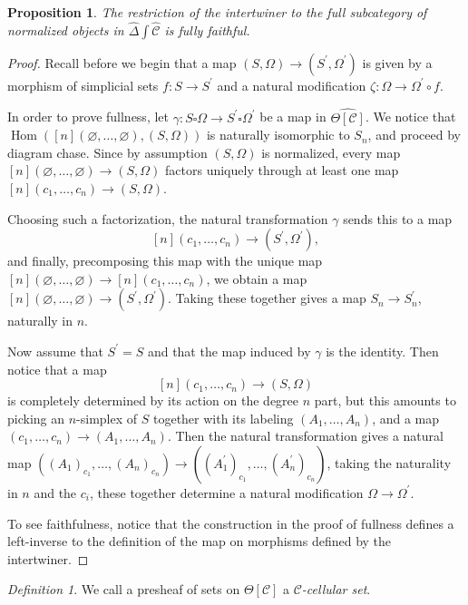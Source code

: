 \documentclass[leqno]{article}
\numberwithin{equation}{subsection}
\theoremstyle{plain}   %
\newtheorem{prop}[equation]{Proposition}
\theoremstyle{remark}
\newtheorem{defn}[equation]{Definition}
\theoremstyle{plain}
\DeclareMathOperator{\Hom}{Hom}
\providecommand{\C}{}
\renewcommand{\C}{\ensuremath{\mathcal{C}}}
\newcommand{\cellset}{\ensuremath{\widehat{\Theta[\mathcal{C}]}}}
\newcommand{\ssetlab}{\ensuremath{\widehat{\Delta} \int \widehat{\mathcal{C}}}}
\begin{document}
\begin{prop} The restriction of the intertwiner to the full subcategory of normalized objects in \(\ssetlab\) is fully faithful.
\end{prop}
\begin{proof}
	Recall before we begin that a map \((S,\Omega)\to (S^\prime,\Omega^\prime)\) is given by a morphism of simplicial sets \(f:S\to S^\prime\) and a natural modification \(\zeta:\Omega\to \Omega^\prime\circ f\).

	In order to prove fullness, let \(\gamma:S\square\Omega\to S^\prime\square\Omega^\prime\) be a map in \(\cellset\). We notice that \(\Hom([n](\varnothing,\dots,\varnothing), (S,\Omega))\) is naturally isomorphic to \(S_n\), and proceed by diagram chase. Since by assumption \((S,\Omega)\) is normalized, every map \([n](\varnothing,\dots,\varnothing)\to (S,\Omega)\) factors uniquely through at least one map \([n](c_1,\dots,c_n)\to (S,\Omega)\).

	Choosing such a factorization, the natural transformation \(\gamma\) sends this to a map \[[n](c_1,\dots,c_n)\to (S^\prime,\Omega^\prime),\] and finally, precomposing this map with the unique map \([n](\varnothing,\dots,\varnothing)\to [n](c_1,\dots,c_n)\), we obtain a map \([n](\varnothing,\dots,\varnothing)\to (S^\prime,\Omega^\prime)\). Taking these together gives a map \(S_n\to S^\prime_n\), naturally in \(n\).

	Now assume that \(S^\prime=S\) and that the map induced by \(\gamma\) is the identity.  Then notice that a map \[[n](c_1,\dots,c_n)\to (S,\Omega)\] is completely determined by its action on the degree \(n\) part, but this amounts to picking an \(n\)-simplex of \(S\) together with its labeling \((A_1,\dots,A_n)\), and a map \((c_1,\dots,c_n)\to (A_1,\dots,A_n)\).  Then the natural transformation gives a natural map \(((A_1)_{c_1},\dots,(A_n)_{c_n})\to ((A^\prime_1)_{c_1},\dots,(A^\prime_n)_{c_n})\), taking the naturality in \(n\) and the \(c_i\), these together determine a natural modification \(\Omega\to \Omega^\prime\).

	To see faithfulness, notice that the construction in the proof of fullness defines a left-inverse to the definition of the map on morphisms defined by the intertwiner.
\end{proof}

\begin{defn} We call a presheaf of sets on \(\Theta[\C]\) a \emph{\(\C\)-cellular set}.
\end{defn}
\end{document}
